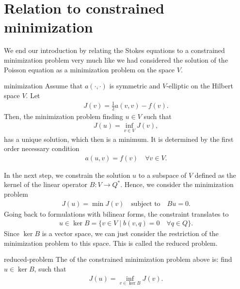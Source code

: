 \section{Relation to constrained minimization}

\begin{intro}
  We end our introduction by relating the Stokes equations to a
  constrained minimization problem very much like we had considered
  the solution of the Poisson equation as a minimization problem on
  the space $V$.
\end{intro}

\begin{Theorem}{minimization}
  Assume that $a(\cdot,\cdot)$ is symmetric and $V$-elliptic on the Hilbert
  space $V$. Let
  \begin{gather}
    J(v) = \tfrac12 a(v,v) - f(v).    
  \end{gather}
  Then, the minimization problem finding $u\in V$ such that
  \begin{align}
    J(u) =\inf_{v\in V} J(v),
  \end{align}
  has a unique solution, which then is a minimum. It is determined by
  the first order necessary condition
  \begin{gather*}
    a(u,v) = f(v) \quad\forall v\in V.
  \end{gather*}
\end{Theorem}

\begin{intro}
  In the next step, we constrain the solution $u$ to a subspace of $V$
  defined as the kernel of the linear operator $B: V\to Q^*$. Hence,
  we consider the minimization problem
  \begin{gather*}
    J(u) =\min J(v) \quad
    \text{subject to}\quad
    Bu = 0.
  \end{gather*}
  Going back to formulations with bilinear forms, the constraint
  translates to
  \begin{gather}
    u\in \ker B = \bigl\{ v\in V \;\big|\;
    b(v,q)=0 \quad\forall q\in Q\}.
  \end{gather}
  Since $\ker B$ is a vector space, we can just consider the
  restriction of the minimization problem to this space. This is
  called the reduced problem.
\end{intro}

\begin{Definition}{reduced-problem}
  The  of the constrained minimization problem
  above is: find $u\in \ker B$, such that
  \begin{gather}
    J(u) =\inf_{v\in \ker B} J(v).
  \end{gather}
\end{Definition}

